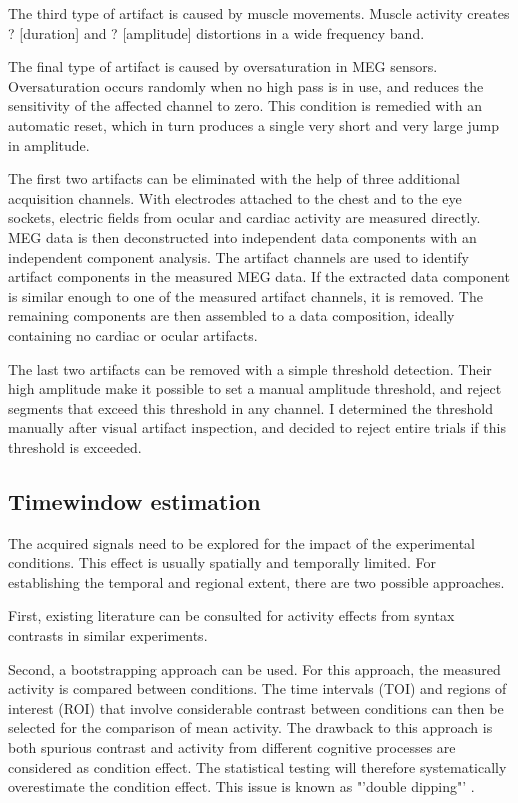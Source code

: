The third type of artifact is caused by muscle movements.
Muscle activity creates ? [duration] and ? [amplitude] distortions in a wide frequency band.

The final type of artifact is caused by oversaturation in MEG sensors.
Oversaturation occurs randomly when no high pass is in use, and reduces the sensitivity of the affected channel to zero.
This condition is remedied with an automatic reset, which in turn produces a single very short and very large jump in amplitude.

The first two artifacts can be eliminated with the help of three additional acquisition channels.
With electrodes attached to the chest and to the eye sockets, electric fields from ocular and cardiac activity are measured directly.
MEG data is then deconstructed into independent data components with an independent component analysis.
The artifact channels are used to identify artifact components in the measured MEG data.
If the extracted data component is similar enough to one of the measured artifact channels, it is removed. 
The remaining components are then assembled to a data composition, ideally containing no cardiac or ocular artifacts.

The last two artifacts can be removed with a simple threshold detection.
Their high amplitude make it possible to set a manual amplitude threshold, and reject segments that exceed this threshold in any channel.
I determined the threshold manually after visual artifact inspection, and decided to reject entire trials if this threshold is exceeded.

\subsection{Timewindow estimation}
The acquired signals need to be explored for the impact of the experimental conditions.
This effect is usually spatially and temporally limited.
For establishing the temporal and regional extent, there are two possible approaches.

First, existing literature can be consulted for activity effects from syntax contrasts in similar experiments.

Second, a bootstrapping approach can be used.
For this approach, the measured activity is compared between conditions.
The time intervals (TOI) and regions of interest (ROI) that involve considerable contrast between conditions can then be selected for the comparison of mean activity.
The drawback to this approach is both spurious contrast and activity from different cognitive processes are considered as condition effect.
The statistical testing will therefore systematically overestimate the condition effect.
This issue is known as "'double dipping"' \cite{1.5.Kriegeskorte}.

